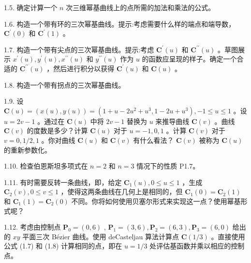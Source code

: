 \documentclass[../main.tex]{subfiles}
\begin{document}
1.5. 确定计算一个 \(n\) 次三维幂基曲线上的点所需的加法和乘法的公式。

1.6. 构造一个带有环的三次幂基曲线。提示:考虑需要什么样的端点和端导数， \({\mathbf{C}}^{\prime }\left( 0\right)\) 和 \({\mathbf{C}}^{\prime }\left( 1\right)\) 。

1.7. 构造一个带有尖点的三次幂基曲线。提示:考虑 \({\mathbf{C}}^{\prime }\left( u\right)\) 和 \({\mathbf{C}}^{\prime \prime }\left( u\right)\) 。草图展示 \({x}^{\prime }\left( u\right) ,{y}^{\prime }\left( u\right) ,{x}^{\prime \prime }\left( u\right)\) 和 \({y}^{\prime \prime }\left( u\right)\) 作为 \(u\) 的函数应呈现的样子。确定一个合适的 \({\mathbf{C}}^{\prime \prime }\left( u\right)\) ，然后进行积分以获得 \({\mathbf{C}}^{\prime }\left( u\right)\) 和 \(\mathbf{C}\left( u\right)\) 。

1.8. 构造一个带有拐点的三次幂基曲线。

1.9. 设 \(\mathbf{C}\left( u\right)  = \left( {x\left( u\right) ,y\left( u\right) }\right)  = \left( {1 + u - 2{u}^{2} + {u}^{3},1 - {2u} + {u}^{3}}\right) , - 1 \leq  u \leq  1\) 。设 \(u = {2v} - 1\) 。通过在 \(\mathbf{C}\left( u\right)\) 中将 \({2v} - 1\) 替换为 \(u\) 来推导曲线 \(\mathbf{C}\left( v\right)\) 。曲线 \(\mathbf{C}\left( v\right)\) 的度数是多少？计算 \(\mathbf{C}\left( u\right)\) 对于 \(u =  - 1,0,1\) 。计算 \(\mathbf{C}\left( v\right)\) 对于 \(v = 0,1/2,1\) 。你对曲线 \(\mathbf{C}\left( u\right)\) 和 \(\mathbf{C}\left( v\right)\) 有什么看法？ \(\mathbf{C}\left( v\right)\) 被称为 \(\mathbf{C}\left( u\right)\) 的重新参数化。

1.10. 检查伯恩斯坦多项式在 \(n = 2\) 和 \(n = 3\) 情况下的性质 P1.7。

1.11. 有时需要反转一条曲线，即，给定 \({\mathbf{C}}_{1}\left( u\right) ,0 \leq  u \leq  1\) ，生成 \({\mathbf{C}}_{2}\left( v\right) ,0 \leq  v \leq  1\) ，使得这两条曲线在几何上是相同的，但 \({\mathbf{C}}_{1}\left( 0\right)  = {\mathbf{C}}_{2}\left( 1\right)\) 和 \({\mathbf{C}}_{1}\left( 1\right)  = {\mathbf{C}}_{2}\left( 0\right)\) 不同。你将如何使用贝塞尔形式来实现这一点？使用幂基形式呢？

1.12. 考虑由控制点 \({\mathbf{P}}_{0} = \left( {0,6}\right)\) , \({\mathbf{P}}_{1} = \left( {3,6}\right) ,{\mathbf{P}}_{2} = \left( {6,3}\right) ,{\mathbf{P}}_{3} = \left( {6,0}\right)\) 给出的 \({xy}\) 平面三次 Bézier 曲线。使用 deCasteljau 算法计算点 \(\mathbf{C}\left( {1/3}\right)\) 。直接使用公式 (1.7) 和 (1.8) 计算相同的点，即在 \(u = 1/3\) 处评估基函数并乘以相应的控制点。
\end{document}
